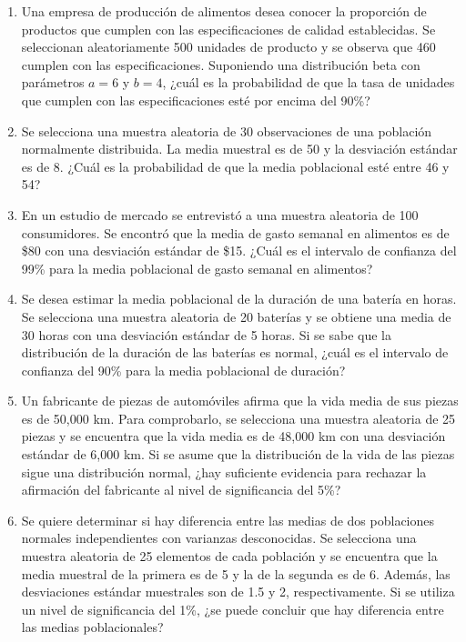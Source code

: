 \begin{Ejer}
\begin{enumerate}
    \item Una empresa de producción de alimentos desea conocer la proporción de productos que cumplen con las especificaciones de calidad establecidas. Se seleccionan aleatoriamente 500 unidades de producto y se observa que 460 cumplen con las especificaciones. Suponiendo una distribución beta con parámetros $a=6$ y $b=4$, ¿cuál es la probabilidad de que la tasa de unidades que cumplen con las especificaciones esté por encima del 90\%?

    \item Se selecciona una muestra aleatoria de 30 observaciones de una población normalmente distribuida. La media muestral es de 50 y la desviación estándar es de 8. ¿Cuál es la probabilidad de que la media poblacional esté entre 46 y 54?

    \item En un estudio de mercado se entrevistó a una muestra aleatoria de 100 consumidores. Se encontró que la media de gasto semanal en alimentos es de \$80 con una desviación estándar de \$15. ¿Cuál es el intervalo de confianza del 99\% para la media poblacional de gasto semanal en alimentos?

    \item Se desea estimar la media poblacional de la duración de una batería en horas. Se selecciona una muestra aleatoria de 20 baterías y se obtiene una media de 30 horas con una desviación estándar de 5 horas. Si se sabe que la distribución de la duración de las baterías es normal, ¿cuál es el intervalo de confianza del 90\% para la media poblacional de duración?

    \item Un fabricante de piezas de automóviles afirma que la vida media de sus piezas es de 50{,}000 km. Para comprobarlo, se selecciona una muestra aleatoria de 25 piezas y se encuentra que la vida media es de 48{,}000 km con una desviación estándar de 6{,}000 km. Si se asume que la distribución de la vida de las piezas sigue una distribución normal, ¿hay suficiente evidencia para rechazar la afirmación del fabricante al nivel de significancia del 5\%?

    \item Se quiere determinar si hay diferencia entre las medias de dos poblaciones normales independientes con varianzas desconocidas. Se selecciona una muestra aleatoria de 25 elementos de cada población y se encuentra que la media muestral de la primera es de 5 y la de la segunda es de 6. Además, las desviaciones estándar muestrales son de 1.5 y 2, respectivamente. Si se utiliza un nivel de significancia del 1\%, ¿se puede concluir que hay diferencia entre las medias poblacionales?


\end{enumerate}
\end{Ejer}
